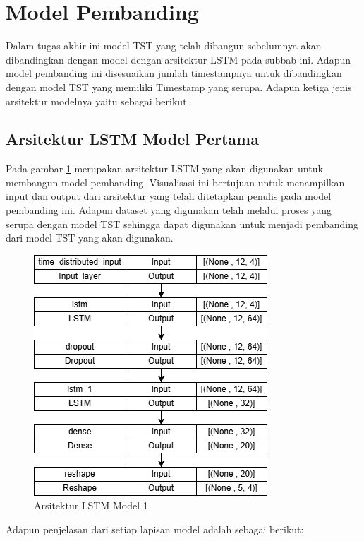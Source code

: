 \section{Model Pembanding}
Dalam tugas akhir ini model TST yang telah dibangun sebelumnya akan dibandingkan dengan model dengan arsitektur LSTM pada subbab ini. Adapun model pembanding ini disesuaikan jumlah timestampnya untuk dibandingkan dengan model TST yang memiliki Timestamp yang serupa. Adapun ketiga jenis arsitektur modelnya yaitu sebagai berikut.

\subsection{Arsitektur LSTM Model Pertama}
Pada gambar \ref{fig:lstm1} merupakan arsitektur LSTM yang akan digunakan untuk membangun model pembanding. Visualisasi ini bertujuan untuk menampilkan input dan output dari arsitektur yang telah ditetapkan penulis pada model pembanding ini. Adapun dataset yang digunakan telah melalui proses yang serupa dengan model TST sehingga dapat digunakan untuk menjadi pembanding dari model TST yang akan digunakan.

\begin{figure} [H] \centering
    \includegraphics[scale=0.8]{gambar/lstmmodel1.png} 
    \caption{Arsitektur LSTM Model 1}
    \label{fig:lstm1}
\end{figure}

Adapun penjelasan dari setiap lapisan model adalah sebagai berikut:

